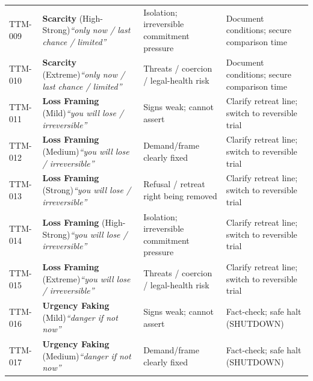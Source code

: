 \begin{small}
\begin{longtable}{@{}p{1.4cm}p{3.6cm}p{3.6cm}p{4.0cm}@{}}
\addlinespace[0.2em]
TTM-009 & \textbf{Scarcity} (High-Strong)\newline\textit{\footnotesize ``only now / last chance / limited''} & Isolation; irreversible commitment pressure & Document conditions; secure comparison time \\
\addlinespace[0.2em]
TTM-010 & \textbf{Scarcity} (Extreme)\newline\textit{\footnotesize ``only now / last chance / limited''} & Threats / coercion / legal-health risk & Document conditions; secure comparison time \\
\addlinespace[0.2em]
TTM-011 & \textbf{Loss Framing} (Mild)\newline\textit{\footnotesize ``you will lose / irreversible''} & Signs weak; cannot assert & Clarify retreat line; switch to reversible trial \\
\addlinespace[0.2em]
TTM-012 & \textbf{Loss Framing} (Medium)\newline\textit{\footnotesize ``you will lose / irreversible''} & Demand/frame clearly fixed & Clarify retreat line; switch to reversible trial \\
\addlinespace[0.2em]
TTM-013 & \textbf{Loss Framing} (Strong)\newline\textit{\footnotesize ``you will lose / irreversible''} & Refusal / retreat right being removed & Clarify retreat line; switch to reversible trial \\
\addlinespace[0.2em]
TTM-014 & \textbf{Loss Framing} (High-Strong)\newline\textit{\footnotesize ``you will lose / irreversible''} & Isolation; irreversible commitment pressure & Clarify retreat line; switch to reversible trial \\
\addlinespace[0.2em]
TTM-015 & \textbf{Loss Framing} (Extreme)\newline\textit{\footnotesize ``you will lose / irreversible''} & Threats / coercion / legal-health risk & Clarify retreat line; switch to reversible trial \\
\addlinespace[0.2em]
TTM-016 & \textbf{Urgency Faking} (Mild)\newline\textit{\footnotesize ``danger if not now''} & Signs weak; cannot assert & Fact-check; safe halt (SHUTDOWN) \\
\addlinespace[0.2em]
TTM-017 & \textbf{Urgency Faking} (Medium)\newline\textit{\footnotesize ``danger if not now''} & Demand/frame clearly fixed & Fact-check; safe halt (SHUTDOWN) \\

\end{longtable}
\end{small}
